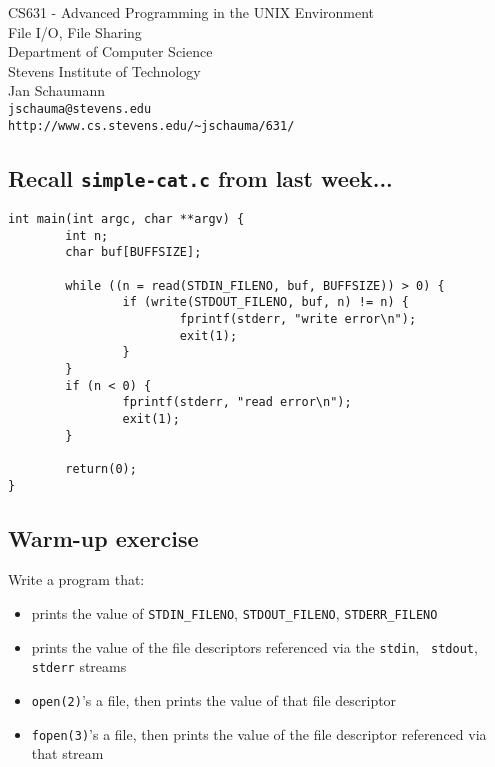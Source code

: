 \documentclass[xga]{xdvislides}
\begin{document}
\setfontphv

\lhead{\slidetitle}
\rhead{\relax}
\cfoot{\relax}
\rfoot{\Gray{\today}}

\vspace*{\fill}
\begin{center}
	\Hugesize
		CS631 - Advanced Programming in the UNIX Environment\\ [1em]
		File I/O, File Sharing
	\hspace*{5mm}\blueline\\ [1em]
	\Normalsize
		Department of Computer Science\\
		Stevens Institute of Technology\\
		Jan Schaumann\\
		\verb+jschauma@stevens.edu+\\
		\verb+http://www.cs.stevens.edu/~jschauma/631/+
\end{center}
\vspace*{\fill}

\subsection{Recall {\tt simple-cat.c} from last week...}
\begin{verbatim}
int main(int argc, char **argv) {
        int n;
        char buf[BUFFSIZE];

        while ((n = read(STDIN_FILENO, buf, BUFFSIZE)) > 0) {
                if (write(STDOUT_FILENO, buf, n) != n) {
                        fprintf(stderr, "write error\n");
                        exit(1);
                }
        }
        if (n < 0) {
                fprintf(stderr, "read error\n");
                exit(1);
        }

        return(0);
}
\end{verbatim}

\subsection{Warm-up exercise}
Write a program that:
\begin{itemize}
	\item prints the value of {\tt STDIN\_FILENO},
		{\tt STDOUT\_FILENO}, {\tt STDERR\_FILENO}
	\item prints the value of the file descriptors
		referenced via the {\tt stdin}, {\tt
		stdout}, {\tt stderr} streams
	\item {\tt open(2)}'s a file, then prints the
		value of that file descriptor
	\item {\tt fopen(3)}'s a file, then prints
		the value of the file descriptor
		referenced via that stream
\end{itemize}
\end{document}
